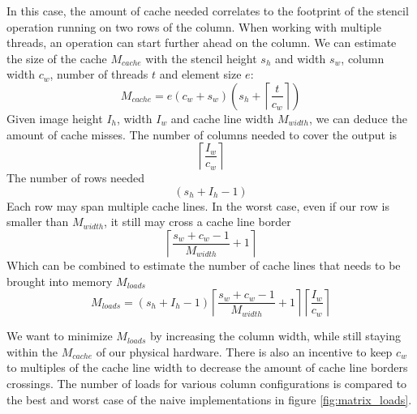 \documentclass{article}
\newcommand{\ceil}[1]{\left\lceil #1 \right\rceil}
\begin{document}
In this case, the amount of cache needed correlates to the footprint of the stencil operation running on two rows of the column.
When working with multiple threads, an operation can start further ahead on the column.
We can estimate the size of the cache $M_{cache}$ with the stencil height $s_h$ and width $s_w$, column width $c_w$, number of threads $t$ and element size $e$:
\[
    M_{cache} = e (c_w + s_w) \left(s_h + \ceil{\frac{t}{c_w}}\right) 
\]
Given image height $I_h$, width $I_w$ and cache line width $M_{width}$, we can deduce the amount of cache misses.
The number of columns needed to cover the output is
\[
    \ceil{\frac{I_w}{c_w}}
\]
The number of rows needed
\[
    (s_h + I_h - 1)    
\]
Each row may span multiple cache lines. In the worst case, even if our row is smaller than $M_{width}$, it still may cross a cache line border
\[
    \ceil{\frac{s_w + c_w - 1}{M_{width}} + 1}
\]
Which can be combined to estimate the number of cache lines that needs to be brought into memory $M_{loads}$
\[
    M_{loads} = (s_h + I_h - 1)\ceil{\frac{s_w + c_w - 1}{M_{width}} + 1}\ceil{\frac{I_w}{c_w}}
\]

We want to minimize $M_{loads}$ by increasing the column width, while still staying within the $M_{cache}$ of our physical hardware.
There is also an incentive to keep $c_w$ to multiples of the cache line width to decrease the amount of cache line borders crossings.
The number of loads for various column configurations is compared to the best and worst case of the naive implementations in figure \ref{fig:matrix_loads}.
\end{document}
